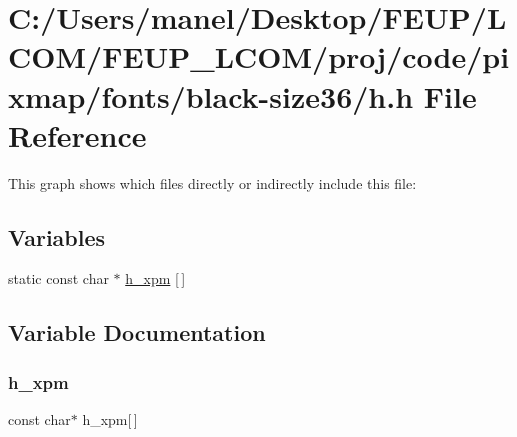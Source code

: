 \hypertarget{black-size36_2h_8h}{}\section{C\+:/\+Users/manel/\+Desktop/\+F\+E\+U\+P/\+L\+C\+O\+M/\+F\+E\+U\+P\+\_\+\+L\+C\+O\+M/proj/code/pixmap/fonts/black-\/size36/h.h File Reference}
\label{black-size36_2h_8h}
This graph shows which files directly or indirectly include this file\+:
\subsection*{Variables}
\begin{DoxyCompactItemize}
\item 
static const char $\ast$ \mbox{\hyperlink{black-size36_2h_8h_a8ebb0554c488a8870e0836f39d4a134c}{h\+\_\+xpm}} \mbox{[}$\,$\mbox{]}
\end{DoxyCompactItemize}


\subsection{Variable Documentation}
\mbox{\label{black-size36_2h_8h_a8ebb0554c488a8870e0836f39d4a134c}} 
\subsubsection{\texorpdfstring{h\_xpm}{h\_xpm}}
{\footnotesize\ttfamily const char$\ast$ h\+\_\+xpm\mbox{[}$\,$\mbox{]}\hspace{0.3cm}{\ttfamily [static]}}

